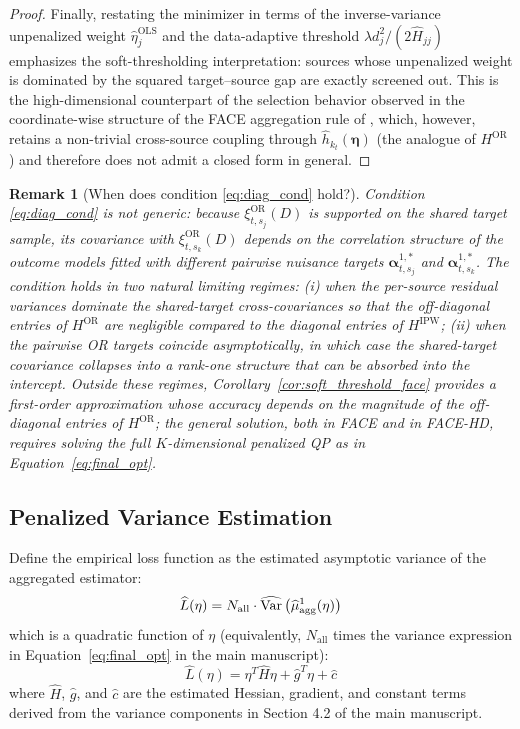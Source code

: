 \documentclass{article}
\newtheorem{remark}{Remark}[section]
\begin{document}
\begin{proof}
Finally, restating the minimizer in terms of the inverse-variance unpenalized weight $\widehat{\eta}_j^{\mathrm{OLS}}$ and the data-adaptive threshold $\lambda d_j^2/(2\widehat{H}_{jj})$ emphasizes the soft-thresholding interpretation: sources whose unpenalized weight is dominated by the squared target--source gap are exactly screened out. This is the high-dimensional counterpart of the selection behavior observed in the coordinate-wise structure of the FACE aggregation rule of \citet{han2025federated}, which, however, retains a non-trivial cross-source coupling through $\widehat{h}_{k_t}(\boldsymbol{\eta})$ (the analogue of $H^{\mathrm{OR}}$) and therefore does not admit a closed form in general.
\end{proof}

\begin{remark}[When does condition \eqref{eq:diag_cond} hold?]\label{rem:diag_condition}
Condition \eqref{eq:diag_cond} is not generic: because $\xi^{\mathrm{OR}}_{t,s_j}(D)$ is supported on the shared target sample, its covariance with $\xi^{\mathrm{OR}}_{t,s_k}(D)$ depends on the correlation structure of the outcome models fitted with different pairwise nuisance targets $\boldsymbol{\alpha}^{1,*}_{t,s_j}$ and $\boldsymbol{\alpha}^{1,*}_{t,s_k}$. The condition holds in two natural limiting regimes: (i) when the per-source residual variances dominate the shared-target cross-covariances so that the off-diagonal entries of $H^{\mathrm{OR}}$ are negligible compared to the diagonal entries of $H^{\mathrm{IPW}}$; (ii) when the pairwise OR targets coincide asymptotically, in which case the shared-target covariance collapses into a rank-one structure that can be absorbed into the intercept. Outside these regimes, Corollary~\ref{cor:soft_threshold_face} provides a first-order approximation whose accuracy depends on the magnitude of the off-diagonal entries of $H^{\mathrm{OR}}$; the general solution, both in FACE and in FACE-HD, requires solving the full $K$-dimensional penalized QP as in Equation~\eqref{eq:final_opt}.
\end{remark}

\subsection{Penalized Variance Estimation}

Define the empirical loss function as the estimated asymptotic variance of the aggregated estimator:
\[
\widehat{L}(\eta) = N_{\mathrm{all}} \cdot \widehat{\operatorname{Var}}\left( \widehat{\mu}^1_{\text{agg}}(\eta) \right)
\]
which is a quadratic function of $\eta$ (equivalently, $N_{\mathrm{all}}$ times the variance expression in Equation~\eqref{eq:final_opt} in the main manuscript):
\[
\widehat{L}(\eta) = \eta^T \widehat{H} \eta + \widehat{g}^T \eta + \widehat{c}
\]
where $\widehat{H}$, $\widehat{g}$, and $\widehat{c}$ are the estimated Hessian, gradient, and constant terms derived from the variance components in Section 4.2 of the main manuscript.
\end{document}
